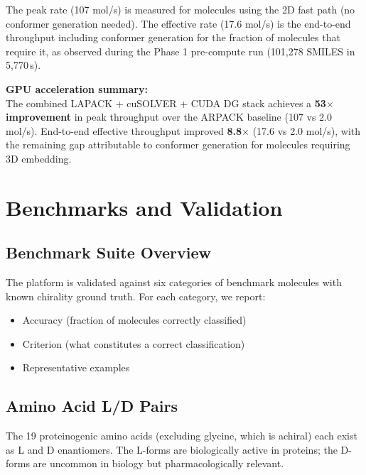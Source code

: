 \documentclass[11pt,a4paper]{article}
\begin{document}
The peak rate (107 mol/s) is measured for molecules using the 2D fast path
(no conformer generation needed). The effective rate (17.6 mol/s) is the
end-to-end throughput including conformer generation for the fraction of
molecules that require it, as observed during the Phase 1 pre-compute run
(101,278 SMILES in 5,770\,s).

\begin{keyresult}
\textbf{GPU acceleration summary:}\\[4pt]
The combined LAPACK + cuSOLVER + CUDA DG stack achieves a \textbf{53$\times$
improvement} in peak throughput over the ARPACK baseline (107 vs 2.0 mol/s).
End-to-end effective throughput improved \textbf{8.8$\times$} (17.6 vs 2.0 mol/s),
with the remaining gap attributable to conformer generation for molecules
requiring 3D embedding.
\end{keyresult}

\newpage

\section{Benchmarks and Validation}
\label{sec:benchmarks}

\subsection{Benchmark Suite Overview}

The platform is validated against six categories of benchmark molecules with
known chirality ground truth. For each category, we report:

\begin{itemize}[leftmargin=1.5em]
  \item Accuracy (fraction of molecules correctly classified)
  \item Criterion (what constitutes a correct classification)
  \item Representative examples
\end{itemize}

\subsection{Amino Acid L/D Pairs}

The 19 proteinogenic amino acids (excluding glycine, which is achiral) each
exist as L and D enantiomers. The L-forms are biologically active in proteins;
the D-forms are uncommon in biology but pharmacologically relevant.
\end{document}

